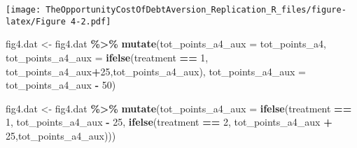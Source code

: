 \documentclass[
]{article}
\newenvironment{Shaded}{\begin{snugshade}}{\end{snugshade}}
\newcommand{\AttributeTok}[1]{\textcolor[rgb]{0.13,0.29,0.53}{#1}}
\newcommand{\DecValTok}[1]{\textcolor[rgb]{0.00,0.00,0.81}{#1}}
\newcommand{\FunctionTok}[1]{\textcolor[rgb]{0.13,0.29,0.53}{\textbf{#1}}}
\newcommand{\NormalTok}[1]{#1}
\newcommand{\OtherTok}[1]{\textcolor[rgb]{0.56,0.35,0.01}{#1}}
\newcommand{\SpecialCharTok}[1]{\textcolor[rgb]{0.81,0.36,0.00}{\textbf{#1}}}
\begin{document}
\texttt{[image: TheOpportunityCostOfDebtAversion\_Replication\_R\_files/figure-latex/Figure 4-2.pdf]}

\begin{Shaded}
\begin{Highlighting}[]
\NormalTok{fig4.dat }\OtherTok{\textless{}{-}}\NormalTok{ fig4.dat }\SpecialCharTok{\%\textgreater{}\%}
  \FunctionTok{mutate}\NormalTok{(}\AttributeTok{tot\_points\_a4\_aux =}\NormalTok{ tot\_points\_a4,}
         \AttributeTok{tot\_points\_a4\_aux =} \FunctionTok{ifelse}\NormalTok{(treatment }\SpecialCharTok{==} \DecValTok{1}\NormalTok{, tot\_points\_a4\_aux}\SpecialCharTok{+}\DecValTok{25}\NormalTok{,tot\_points\_a4\_aux),}
         \AttributeTok{tot\_points\_a4\_aux =}\NormalTok{ tot\_points\_a4\_aux }\SpecialCharTok{{-}} \DecValTok{50}\NormalTok{)}

\NormalTok{fig4.dat }\OtherTok{\textless{}{-}}\NormalTok{ fig4.dat }\SpecialCharTok{\%\textgreater{}\%}
  \FunctionTok{mutate}\NormalTok{(}\AttributeTok{tot\_points\_a4\_aux =} \FunctionTok{ifelse}\NormalTok{(treatment }\SpecialCharTok{==} \DecValTok{1}\NormalTok{, tot\_points\_a4\_aux }\SpecialCharTok{{-}} \DecValTok{25}\NormalTok{,}
                                    \FunctionTok{ifelse}\NormalTok{(treatment }\SpecialCharTok{==} \DecValTok{2}\NormalTok{, tot\_points\_a4\_aux }\SpecialCharTok{+} \DecValTok{25}\NormalTok{,tot\_points\_a4\_aux)))}


\end{Highlighting}
\end{Shaded}
\end{document}
